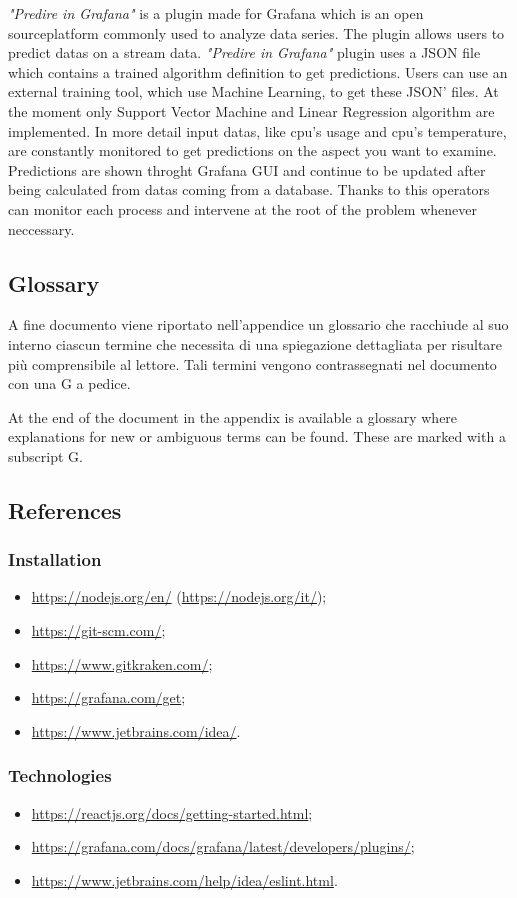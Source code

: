 \emph{"Predire in Grafana"} is a plugin made for Grafana which is an open source\glo platform commonly used to analyze data series. The plugin allows users to predict datas on a stream data. \emph{"Predire in Grafana"} plugin uses a JSON file which contains a trained algorithm definition to get predictions. Users can use an external training tool, which use Machine Learning\glo , to get these JSON' files. At the moment only Support Vector Machine and Linear Regression algorithm are implemented. In more detail input datas, like cpu's usage and cpu's temperature, are constantly monitored to get predictions on the aspect you want to examine. Predictions are shown throght Grafana GUI and continue to be updated after being calculated from datas coming from a database. Thanks to this operators can monitor each process and intervene at the root of the problem whenever neccessary.


\subsection{Glossary}
A fine documento viene riportato nell'appendice un glossario che racchiude al suo interno ciascun termine che necessita di una spiegazione dettagliata per risultare più comprensibile al lettore. Tali termini vengono contrassegnati nel documento con una G a pedice.
 
At the end of the document in the appendix is available a glossary where explanations for new or ambiguous terms can be found. These are marked with a subscript G.

\subsection{References}
\subsubsection{Installation}
\begin{itemize}
	\item \url{https://nodejs.org/en/} (\url{https://nodejs.org/it/});
	\item \url{https://git-scm.com/};
	\item \url{https://www.gitkraken.com/};
	\item \url{https://grafana.com/get};
	\item \url{https://www.jetbrains.com/idea/}.
\end{itemize}
\subsubsection{Technologies}
\begin{itemize}
	\item \url{https://reactjs.org/docs/getting-started.html};
	\item \url{https://grafana.com/docs/grafana/latest/developers/plugins/};
	\item \url{https://www.jetbrains.com/help/idea/eslint.html}.
\end{itemize}
